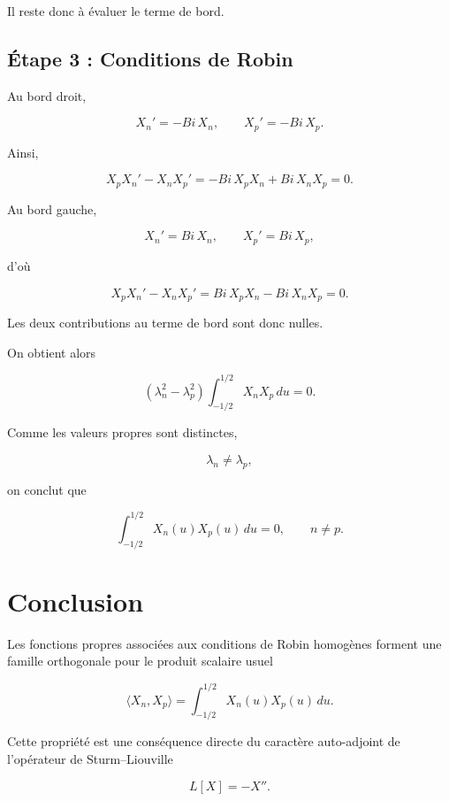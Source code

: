 \documentclass[10pt]{article}
\begin{document}
Il reste donc à évaluer le terme de bord.

\subsection*{Étape 3 : Conditions de Robin}

Au bord droit,

\[
X_n'
=
-Bi\,X_n,
\qquad
X_p'
=
-Bi\,X_p.
\]

Ainsi,

\[
X_pX_n'
-
X_nX_p'
=
-Bi\,X_pX_n
+
Bi\,X_nX_p
=
0.
\]

Au bord gauche,

\[
X_n'
=
Bi\,X_n,
\qquad
X_p'
=
Bi\,X_p,
\]

d'où

\[
X_pX_n'
-
X_nX_p'
=
Bi\,X_pX_n
-
Bi\,X_nX_p
=
0.
\]

Les deux contributions au terme de bord sont donc nulles.

On obtient alors

\[
(\lambda_n^2-\lambda_p^2)
\int_{-1/2}^{1/2}
X_nX_p\,du
=
0.
\]

Comme les valeurs propres sont distinctes,

\[
\lambda_n\neq\lambda_p,
\]

on conclut que

\[
\boxed{
\int_{-1/2}^{1/2}
X_n(u)X_p(u)\,du
=
0,
\qquad
n\neq p.
}
\]

\section*{Conclusion}

Les fonctions propres associées aux conditions de Robin homogènes forment une famille orthogonale pour le produit scalaire usuel

\[
\langle X_n,X_p\rangle
=
\int_{-1/2}^{1/2}
X_n(u)X_p(u)\,du.
\]

Cette propriété est une conséquence directe du caractère auto-adjoint de l'opérateur de Sturm--Liouville

\[
L[X]=-X''.
\]
\end{document}
